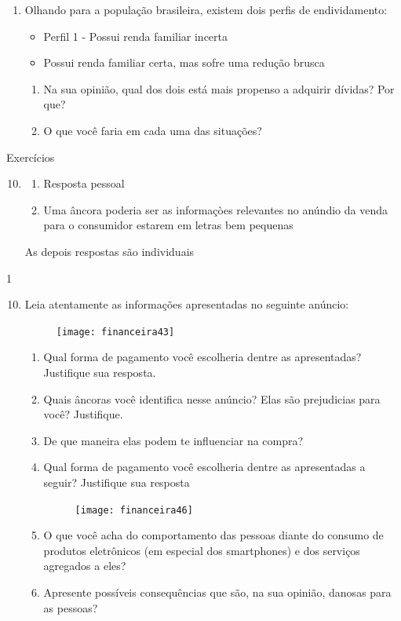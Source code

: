 \begin{enumerate}
\item Olhando para a população brasileira, existem dois perfis de endividamento:
  \begin{itemize}
  \item Perfil 1 - Possui renda familiar incerta
  \item Possui renda familiar certa, mas sofre uma redução brusca
  \end{itemize}
  \begin{enumerate}
  \item Na sua opinião, qual dos dois está mais propenso a adquirir dívidas? Por que?
  \item O que você faria em cada uma das situações?
  \end{enumerate}
\end{enumerate}
\clearpage
\begin{resposta}{Exercícios}
{
  \begin{enumerate}\setcounter{enumi}{9}
  \item
  \begin{enumerate}
    \item Resposta pessoal
    \item Uma âncora poderia ser as informaçòes relevantes no anúndio da venda para o consumidor estarem em letras bem pequenas
  \end{enumerate}
  As depois respostas são individuais
\end{enumerate}
}{1}
\end{resposta}
\begin{enumerate}
  \setcounter{enumi}{9}
\item Leia atentamente as informações apresentadas no seguinte anúncio:

\begin{figure}[H]
\centering

\texttt{[image: financeira43]}
\end{figure}

  \begin{enumerate}
  \item Qual forma de pagamento você escolheria dentre as apresentadas? Justifique sua resposta.
  \item Quais âncoras você identifica nesse anúncio? Elas são prejudicias para você? Justifique.
  \item De que maneira elas podem te influenciar na compra?
  \item Qual forma de pagamento você escolheria dentre as apresentadas a seguir? Justifique sua resposta
  \begin{figure}[H]
  \centering

  \texttt{[image: financeira46]}
  \end{figure}
  \item O que você acha do comportamento das pessoas diante do consumo de produtos eletrônicos (em especial dos smartphones) e dos serviços agregados a eles?
  \item Apresente possíveis consequências que são, na sua opinião, danosas para as pessoas?
  \end{enumerate}
\end{enumerate}
